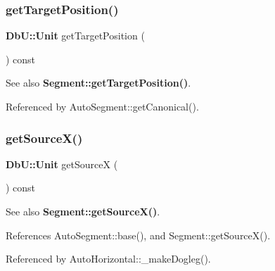 \mbox{\label{classKatabatic_1_1AutoSegment_a65dea76b4efad9d3caa78be44e96c94c}} 
\subsubsection{\texorpdfstring{get\+Target\+Position()}{getTargetPosition()}}
{\footnotesize\ttfamily \textbf{ Db\+U\+::\+Unit} get\+Target\+Position (\begin{DoxyParamCaption}{ }\end{DoxyParamCaption}) const\hspace{0.3cm}{\ttfamily [inline]}}

\begin{DoxySeeAlso}{See also}
\textbf{ Segment\+::get\+Target\+Position()}. 
\end{DoxySeeAlso}


Referenced by Auto\+Segment\+::get\+Canonical().

\mbox{\label{classKatabatic_1_1AutoSegment_a8a8e127557d70de70f9efb488be30d1a}} 
\subsubsection{\texorpdfstring{get\+Source\+X()}{getSourceX()}}
{\footnotesize\ttfamily \textbf{ Db\+U\+::\+Unit} get\+SourceX (\begin{DoxyParamCaption}{ }\end{DoxyParamCaption}) const\hspace{0.3cm}{\ttfamily [inline]}}

\begin{DoxySeeAlso}{See also}
\textbf{ Segment\+::get\+Source\+X()}. 
\end{DoxySeeAlso}


References Auto\+Segment\+::base(), and Segment\+::get\+Source\+X().



Referenced by Auto\+Horizontal\+::\+\_\+make\+Dogleg().

